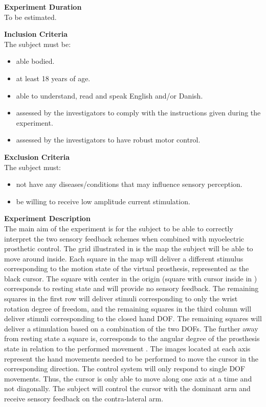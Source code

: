 \textbf{Experiment Duration} \\
To be estimated.

\textbf{Inclusion Criteria} \\
The subject must be:
\begin{itemize}
	\item able bodied. %
	\item at least 18 years of age.
	\item able to understand, read and speak English and/or Danish.
	\item assessed by the investigators to comply with the instructions given during the experiment.
	\item assessed by the investigators to have robust motor control.
\end{itemize}

\textbf{Exclusion Criteria} \\
The subject must:
\begin{itemize}
	\item not have any diseases/conditions that may influence sensory perception.
	\item be willing to receive low amplitude current stimulation. 
\end{itemize}

\textbf{{\Large Experiment Description}} \\
\newline
The main aim of the experiment is for the subject to be able to correctly interpret the two sensory feedback schemes when combined with myoelectric prosthetic control. The grid illustrated in  is the map the subject will be able to move around inside. Each square in the map will deliver a different stimulus corresponding to the motion state of the virtual prosthesis, represented as the black cursor. The square with center in the origin (square with cursor inside in ) corresponds to resting state and will provide no sensory feedback. The remaining squares in the first row will deliver stimuli corresponding to only the wrist rotation degree of freedom, and the remaining squares in the third column will deliver stimuli corresponding to the closed hand DOF. The remaining squares will deliver a stimulation based on a combination of the two DOFs. The further away from resting state a square is, corresponds to the angular degree of the prosthesis state in relation to the performed movement .
The images located at each axis represent the hand movements needed to be performed to move the cursor in the corresponding direction. The control system will only respond to single DOF movements. Thus, the cursor is only able to move along one axis at a time and not diagonally. The subject will control the cursor with the dominant arm and receive sensory feedback on the contra-lateral arm. 

